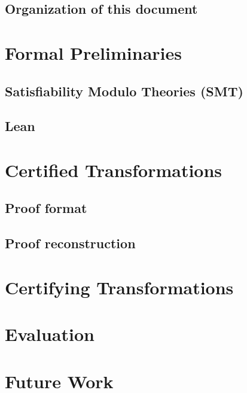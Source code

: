 \documentclass[
	msc,
	english
]{ppgccufmg}
\begin{document}
	  \section{Organization of this document}
	    
	\chapter{Formal Preliminaries}
      \section{Satisfiability Modulo Theories (SMT)}\label{sec:smt}
        
    \section{Lean}
        
    \chapter{Certified Transformations}\label{chap:certified}
    
      \section{Proof format}\label{sec:gen-scripts}
        
      \section{Proof reconstruction}\label{sec:certified_rcons}
        
    \chapter{Certifying Transformations}\label{chap:rcons}
        
	\chapter{Evaluation}
	\chapter{Future Work}\label{chap:future}

		
		
\end{document}
